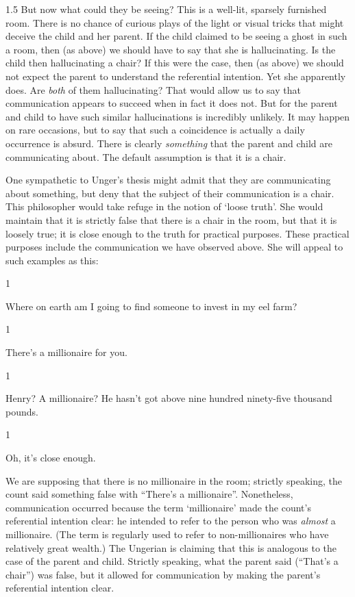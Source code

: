 \documentclass[11pt]{article}
\newcommand{\stage}[3]%
{%
	\begin{spacing}{1}%
	\vspace{0pt}
		\begin{description}[style=nextline, parsep=0pt, leftmargin=15mm, itemindent=-10mm, font=\mdseries]
			\item[\textsc{#1} \emph{#2}] #3
		\end{description}%
	\end{spacing}%
}
\begin{document}
\begin{spacing}{1.5}
But now what could they be seeing? This is a well-lit, sparsely furnished room. There is no chance of curious plays of the light or visual tricks that might deceive the child and her parent. If the child claimed to be seeing a ghost in such a room, then (as above) we should have to say that she is hallucinating. Is the child then hallucinating a chair? If this were the case, then (as above) we should not expect the parent to understand the referential intention. Yet she apparently does. Are {\em both} of them hallucinating? That would allow us to say that communication appears to succeed when in fact it does not. But for the parent and child to have such similar hallucinations is incredibly unlikely. It may happen on rare occasions, but to say that such a coincidence is actually a daily occurrence is absurd. There is clearly {\em something} that the parent and child are communicating about. The default assumption is that it is a chair.

One sympathetic to Unger's thesis might admit that they are communicating about something, but deny that the subject of their communication is a chair. This philosopher would take refuge in the notion of `loose truth'. She would maintain that it is strictly false that there is a chair in the room, but that it is loosely true; it is close enough to the truth for practical purposes. These practical purposes include the communication we have observed above. She will appeal to such examples as this:

\stage{Countess}{}{Where on earth am I going to find someone to invest in my eel farm?}

\stage{Count}{(pointing)}{There's a millionaire for you.}

\stage{Countess}{(incredulous)}{Henry? A millionaire? He hasn't got above nine hundred ninety-five thousand pounds.}

\stage{Count}{}{Oh, it's close enough.}

We are supposing that there is no millionaire in the room; strictly speaking, the count said something false with ``There's a millionaire''. Nonetheless, communication occurred because the term `millionaire' made the count's referential intention clear: he intended to refer to the person who was {\em almost} a millionaire. (The term is regularly used to refer to non-millionaires who have relatively great wealth.) The Ungerian is claiming that this is analogous to the case of the parent and child. Strictly speaking, what the parent said (``That's a chair'') was false, but it allowed for communication by making the parent's referential intention clear.


\end{spacing}
\end{document}
